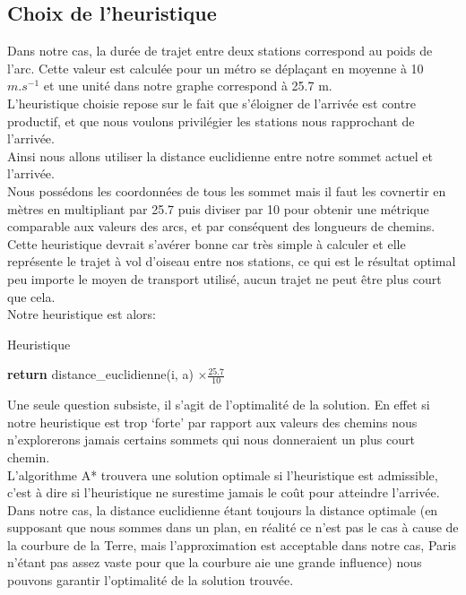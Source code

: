 \documentclass{article}
\begin{document}
\subsection{Choix de l'heuristique}

Dans notre cas, la durée de trajet entre deux stations correspond au poids de l'arc. Cette valeur
est calculée pour un métro se déplaçant en moyenne à 10 $m.s^{-1}$ et une unité dans notre graphe
correspond à 25.7 m.\\

L'heuristique choisie repose sur le fait que s'éloigner de l'arrivée est contre productif, et que
nous voulons privilégier les stations nous rapprochant de l'arrivée.\\
Ainsi nous allons utiliser la distance euclidienne entre notre sommet actuel et l'arrivée.\\
Nous possédons les coordonnées de tous les sommet mais il faut les covnertir en mètres en multipliant
par 25.7 puis diviser par 10 pour obtenir une métrique comparable aux valeurs des arcs, et par 
conséquent des longueurs de chemins.\\
Cette heuristique devrait s'avérer bonne car très simple à calculer et elle représente le trajet à
vol d'oiseau entre nos stations, ce qui est le résultat optimal peu importe le moyen de transport
utilisé, aucun trajet ne peut être plus court que cela.\\

Notre heuristique est alors:\\

\begin{algorithm}
\caption{Heuristique}\label{heuristique}
\begin{algorithmic}[1]
 
	\State \textbf{return} distance\_euclidienne(i, a) $\times \frac{25.7}{10}$
\EndProcedure
\end{algorithmic}
\end{algorithm}

Une seule question subsiste, il s'agit de l'optimalité de la solution. En effet si notre heuristique
est trop `forte' par rapport aux valeurs des chemins nous n'explorerons jamais certains sommets
qui nous donneraient un plus court chemin.\\
L'algorithme A* trouvera une solution optimale si l'heuristique est admissible, c'est à dire si
l'heuristique ne surestime jamais le coût pour atteindre l'arrivée.\\
Dans notre cas, la distance euclidienne étant toujours la distance optimale (en supposant que nous sommes
dans un plan, en réalité ce n'est pas le cas à cause de la courbure de la Terre, mais l'approximation
est acceptable dans notre cas, Paris n'étant pas assez vaste pour que la courbure aie une grande influence)
nous pouvons garantir l'optimalité de la solution trouvée.\\\\
\end{document}

